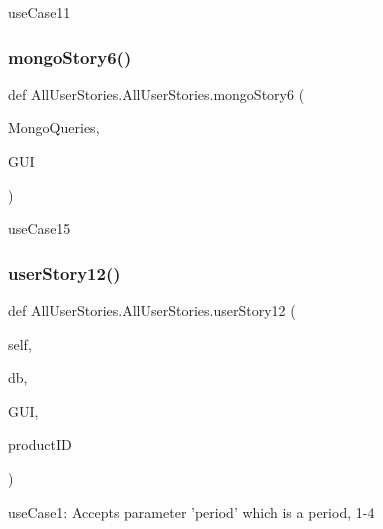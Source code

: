\begin{DoxyVerb}useCase11 \end{DoxyVerb}
 \hypertarget{class_all_user_stories_1_1_all_user_stories_a28910ecdf86a20ec3e21acbc600cfb4f}{}\label{class_all_user_stories_1_1_all_user_stories_a28910ecdf86a20ec3e21acbc600cfb4f} 
\subsubsection{\texorpdfstring{mongo\+Story6()}{mongoStory6()}}
{\footnotesize\ttfamily def All\+User\+Stories.\+All\+User\+Stories.\+mongo\+Story6 (\begin{DoxyParamCaption}\item[{}]{Mongo\+Queries,  }\item[{}]{G\+UI }\end{DoxyParamCaption})}

\begin{DoxyVerb}useCase15 \end{DoxyVerb}
 \hypertarget{class_all_user_stories_1_1_all_user_stories_afce2cf693ebf64cf3e056995968ffe29}{}\label{class_all_user_stories_1_1_all_user_stories_afce2cf693ebf64cf3e056995968ffe29} 
\subsubsection{\texorpdfstring{user\+Story12()}{userStory12()}}
{\footnotesize\ttfamily def All\+User\+Stories.\+All\+User\+Stories.\+user\+Story12 (\begin{DoxyParamCaption}\item[{}]{self,  }\item[{}]{db,  }\item[{}]{G\+UI,  }\item[{}]{product\+ID }\end{DoxyParamCaption})}

\begin{DoxyVerb}useCase1: Accepts parameter 'period' which is a period, 1-4 \end{DoxyVerb}
 \hypertarget{class_all_user_stories_1_1_all_user_stories_ad0f925eabb44f073abfa723cf10205e7}{}\label{class_all_user_stories_1_1_all_user_stories_ad0f925eabb44f073abfa723cf10205e7} 
